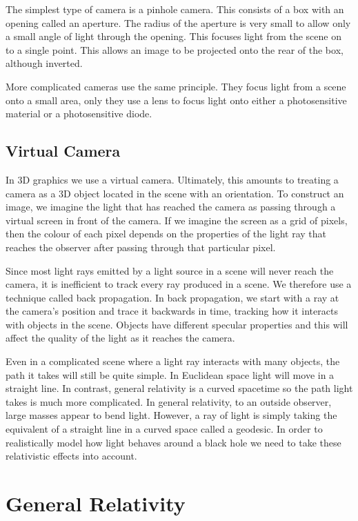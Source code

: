\documentclass[11pt,a4paper,fleqn]{article}
\begin{document}
The simplest type of camera is a pinhole camera. This consists of a box with an opening called an aperture. The radius of the aperture is very small to allow only a small angle of light through the opening. This focuses light from the scene on to a single point. This allows an image to be projected onto the rear of the box, although inverted. \cite{SturmPeter2014PCM}

More complicated cameras use the same principle. They focus light from a scene onto a small area, only they use a lens to focus light onto either a photosensitive material or a photosensitive diode.

\subsection{Virtual Camera}
In 3D graphics we use a virtual camera. Ultimately, this amounts to treating a camera as a 3D object located in the scene with an orientation. To construct an image, we imagine the light that has reached the camera as passing through a virtual screen in front of the camera. If we imagine the screen as a grid of pixels, then the colour of each pixel depends on the properties of the light ray that reaches the observer after passing through that particular pixel. \cite{KrivanekJaroslav2009ItRT}

Since most light rays emitted by a light source in a scene will never reach the camera, it is inefficient to track every ray produced in a scene. We therefore use a technique called back propagation. In back propagation, we start with a ray at the camera's position and trace it backwards in time, tracking how it interacts with objects in the scene. Objects have different specular properties and this will affect the quality of the light as it reaches the camera.

Even in a complicated scene where a light ray interacts with many objects, the path it takes will still be quite simple. In Euclidean space light will move in a straight line. In contrast, general relativity is a curved spacetime so the path light takes is much more complicated. In general relativity, to an outside observer, large masses appear to bend light. However, a ray of light is simply taking the equivalent of a straight line in a curved space called a geodesic. In order to realistically model how light behaves around a black hole we need to take these relativistic effects into account.


\section{General Relativity}
\end{document}
